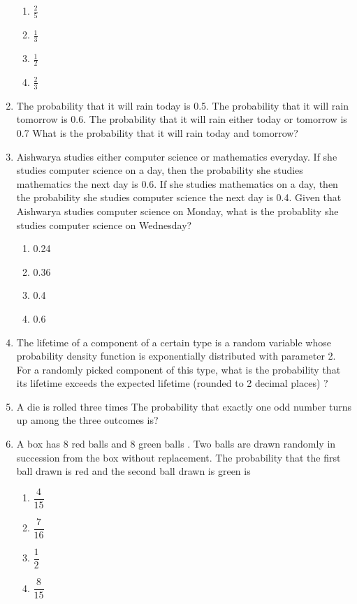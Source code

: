 \documentclass[journal,12pt,twocolumn]{IEEEtran}
\begin{document}
\begin{enumerate}
\begin{enumerate}
\item $ \frac{2}{5}$\\
\item $\frac{1}{3}$\\
\item $ \frac{1}{2}$\\
\item $\frac{2}{3}$

\end{enumerate}  
%
%
%
\item The probability that it will rain today is 0.5. The probability that it will rain tomorrow is 0.6. The probability that it will rain either today or tomorrow is 0.7 What is the probability that it will rain today and tomorrow?
%
\solution

\item Aishwarya studies either computer science or mathematics everyday. If she studies computer science on a day, then the probability she studies mathematics the next day is 0.6. If she studies mathematics on a day, then the probability she studies computer science the next day is 0.4.
Given that Aishwarya studies computer science on Monday, what is the probablity she studies computer science on Wednesday?
\begin{enumerate}[label=(\Alph*)]

\item 0.24
\item 0.36
\item 0.4
\item 0.6

\end{enumerate}
%
\solution

%
\item The lifetime of a component of a certain type is a random variable whose probability density function is exponentially distributed with parameter 2. For a randomly picked component of this type, what is the probability that its lifetime exceeds the expected lifetime (rounded to 2 decimal places) ?
%
\solution

%
\item A die is rolled three times The probability that exactly one odd number turns up among the three outcomes is?
%
\solution

%
\item A box has 8 red balls and 8 green balls . Two balls are drawn randomly in succession from the box without replacement. The probability that the first ball drawn is red and the second ball drawn is green is \\
\begin{enumerate}
\item $\dfrac{4}{15}$\\
\item $\dfrac{7}{16}$\\
\item $\dfrac{1}{2}$\\
\item $\dfrac{8}{15}$\\
\end{enumerate}
%
\solution



\end{enumerate}
\end{document}
